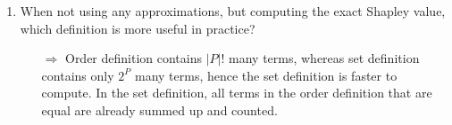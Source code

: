 \begin{enumerate}
\begin{itemize}
	\end{itemize}
    \item When not using any approximations, but computing the exact Shapley value, which definition is more useful in practice?
	\begin{itemize}
		\item[$\Rightarrow$] Order definition contains $|P|!$ many terms, whereas set definition contains only $2^P$ many terms, hence the set definition is faster to compute.
        In the set definition, all terms in the order definition that are equal are already summed up and counted.
	\end{itemize}
\end{enumerate}
